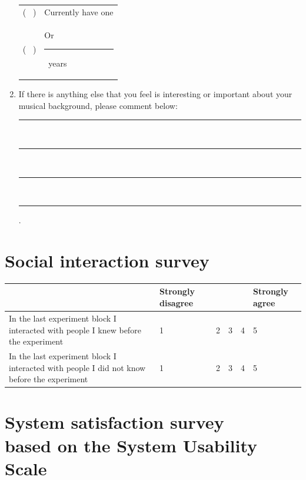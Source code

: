 \documentclass[a4paper,11pt]{article}
\newcommand{\myunderline}{\rule{2in}{.5pt}}
\begin{document}
\begin{appendices}
\begin{enumerate}[resume]
	\begin{tabular}{l l}
		( \ ) & Currently have one \\
		( \ ) & Or \myunderline \ years \\
	\end{tabular}

	\item \label{appendix:music:after_break}If there is anything else that you feel is interesting or important about your musical background, please comment below:

	\rule{4.5in}{.5pt} \\
	\rule{4.5in}{.5pt} \\
	\rule{4.5in}{.5pt} \\
	\rule{4.5in}{.5pt}.

\end{enumerate}

\section{Social interaction survey}

\begin{tabularx}{\textwidth}{p{2in} | Y Y Y Y Y }
	& Strongly disagree & & & & Strongly agree \\
	\hline
	In the last experiment block I interacted with people I knew before the experiment & 1 & 2 & 3 & 4 & 5 \\
	\hline
	In the last experiment block I interacted with people I did not know before the experiment & 1 & 2 & 3 & 4 & 5 \\
\end{tabularx}

\section[System satisfaction survey]{System satisfaction survey\\
	{\normalsize based on the System Usability Scale}}


\end{appendices}
\end{document}
